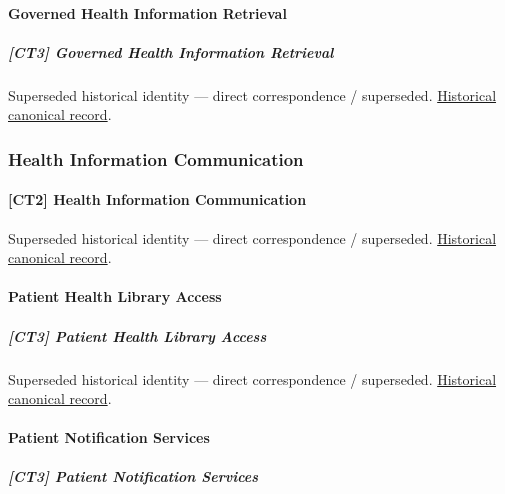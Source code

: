 \paragraph{Governed Health Information Retrieval}

\subparagraph{[CT3] Governed Health Information Retrieval}

\par\label{element:90b838d703dd472b8b6d74961f3a748c}
Superseded historical identity — direct correspondence / superseded. \href{../../../../continuum/strategy/capability/90b838d703dd472b8b6d74961f3a748c.md}{Historical canonical record}.\par

\subsubsection{Health Information Communication}

\paragraph{[CT2] Health Information Communication}

\par\label{element:bcefb378424842fcb6d703208c3f8773}
Superseded historical identity — direct correspondence / superseded. \href{../../../../continuum/strategy/capability/bcefb378424842fcb6d703208c3f8773.md}{Historical canonical record}.\par

\paragraph{Patient Health Library Access}

\subparagraph{[CT3] Patient Health Library Access}

\par\label{element:b132224cfa6f435f8f2a66a3878d6df6}
Superseded historical identity — direct correspondence / superseded. \href{../../../../continuum/strategy/capability/b132224cfa6f435f8f2a66a3878d6df6.md}{Historical canonical record}.\par

\paragraph{Patient Notification Services}

\subparagraph{[CT3] Patient Notification Services}

